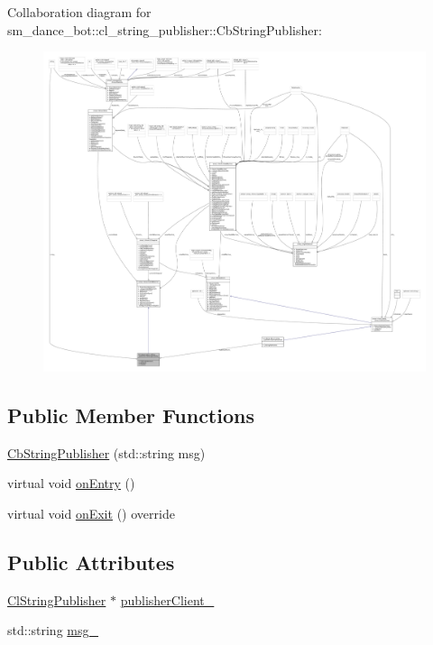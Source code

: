 Collaboration diagram for sm\+\_\+dance\+\_\+bot\+:\+:cl\+\_\+string\+\_\+publisher\+:\+:Cb\+String\+Publisher\+:
\nopagebreak
\begin{figure}[H]
\begin{center}
\leavevmode
\includegraphics[width=350pt]{classsm__dance__bot_1_1cl__string__publisher_1_1CbStringPublisher__coll__graph}
\end{center}
\end{figure}
\subsection*{Public Member Functions}
\begin{DoxyCompactItemize}
\item 
\hyperlink{classsm__dance__bot_1_1cl__string__publisher_1_1CbStringPublisher_abe08b99960be5c26acce0cb062ceea5f}{Cb\+String\+Publisher} (std\+::string msg)
\item 
virtual void \hyperlink{classsm__dance__bot_1_1cl__string__publisher_1_1CbStringPublisher_a7aa533578e820ee90d92d15b85d42e9b}{on\+Entry} ()
\item 
virtual void \hyperlink{classsm__dance__bot_1_1cl__string__publisher_1_1CbStringPublisher_ac93cc1eb150140331cb3e560ec8249e2}{on\+Exit} () override
\end{DoxyCompactItemize}
\subsection*{Public Attributes}
\begin{DoxyCompactItemize}
\item 
\hyperlink{classsm__dance__bot_1_1cl__string__publisher_1_1ClStringPublisher}{Cl\+String\+Publisher} $\ast$ \hyperlink{classsm__dance__bot_1_1cl__string__publisher_1_1CbStringPublisher_aafcad6e6296a3088cb91ffeb22025bd6}{publisher\+Client\+\_\+}
\item 
std\+::string \hyperlink{classsm__dance__bot_1_1cl__string__publisher_1_1CbStringPublisher_a320ff6940dc15b469af3679d2d2eb655}{msg\+\_\+}
\end{DoxyCompactItemize}


